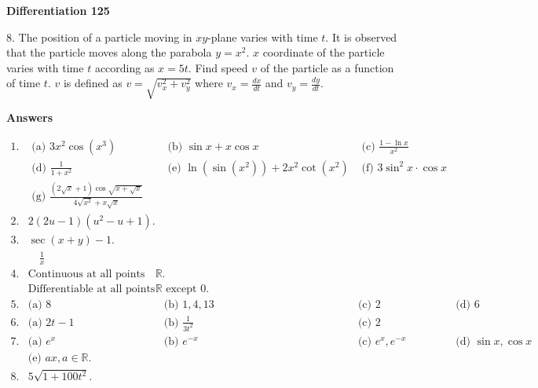 


\noindent
\textbf{Differentiation \hfill 125}

\vspace{2em}

8. The position of a particle moving in \(xy\)-plane varies with time \(t\). It is observed that the particle moves along the parabola \(y = x^2\). \(x\) coordinate of the particle varies with time \(t\) according as \(x = 5t\). Find speed \(v\) of the particle as a function of time \(t\). \(v\) is defined as \(v = \sqrt{v_x^2 + v_y^2}\) where \(v_x = \frac{dx}{dt}\) and \(v_y = \frac{dy}{dt}\).

\begin{center}
\textbf{Answers}
\end{center}

\begin{align*}
1. & \text{ (a) } 3x^2 \cos(x^3) & \text{ (b) } \sin x + x \cos x & \text{ (c) } \frac{1 - \ln x}{x^2} \\
   & \text{ (d) } \frac{1}{1 + x^2} & \text{ (e) } \ln (\sin(x^2)) + 2x^2 \cot(x^2) & \text{ (f) } 3 \sin^2 x \cdot \cos x \\
   & \text{ (g) } \frac{ (2\sqrt{x} + 1) \cos \sqrt{x + \sqrt{x}} }{ 4 \sqrt{x^2} + x \sqrt{x} } \\
2. & 2(2u - 1)(u^2 - u + 1). \\
3. & \sec(x + y) - 1. \\
   & \quad \frac{1}{x} \\
4. & \text{Continuous at all points in } \mathbb{R}. \\
   & \text{Differentiable at all points in } \mathbb{R} \text{ except } 0. \\
5. & \text{(a) } 8 & \text{(b) } 1, 4, 13 & \text{(c) } 2 & \text{(d) } 6 \\
6. & \text{(a) } 2t - 1 & \text{(b) } \frac{1}{3t^2} & \text{(c) } 2 \\
7. & \text{(a) } e^x & \text{(b) } e^{-x} & \text{(c) } e^x, e^{-x} & \text{(d) } \sin x, \cos x \\
   & \text{(e) } ax, a \in \mathbb{R}. \\
8. & 5\sqrt{1 + 100t^2}. \\
\end{align*}


